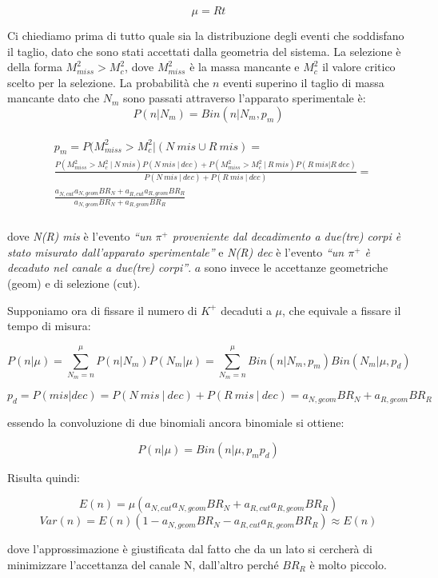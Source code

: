\documentclass[8pt]{extarticle}
\begin{document}
$$
\mu = Rt
$$

Ci chiediamo prima di tutto quale sia la distribuzione degli eventi che soddisfano il taglio, dato che sono stati accettati dalla geometria del sistema. La selezione è della forma $M^2_{miss} > M^2_c$, dove $M^2_{miss}$ è la massa mancante e $M^2_c$ il valore critico scelto per la selezione. La probabilità che $n$ eventi superino il taglio di massa mancante dato che $N_m$ sono passati attraverso l'apparato sperimentale è:
$$
P(n | N_m) = Bin(n | N_m, p_m)
$$

\begin{align*}
\begin{split}
& p_m = P(M^2_{miss} > M^2_c | (N\ mis \cup R\ mis) = \\
& \frac{P(M^2_{miss} > M^2_c\ |\ N\ mis)P(N\ mis\ |\ dec) + P(M^2_{miss} > M^2_c\ |\ R\ mis)P(R\ mis | R\ dec)}{P(N\ mis\ |\ dec) + P(R\ mis\ |\ dec)} = \\
& \frac{a_{N, cut}a_{N, geom}BR_N + a_{R, cut}a_{R, geom}BR_R}{a_{N, geom}BR_N + a_{R, geom}BR_R} \\
\end{split}
\end{align*}

\justify

dove \textit{N(R) mis} è l'evento \textit{``un $\pi^+$ proveniente dal decadimento a due(tre) corpi è stato misurato dall'apparato sperimentale''} e \textit{N(R) dec} è l'evento \textit{``un $\pi^+$ è decaduto nel canale a due(tre) corpi''}. $a$ sono invece le accettanze geometriche (geom) e di selezione (cut).

Supponiamo ora di fissare il numero di $K^+$ decaduti a $\mu$, che equivale a fissare il tempo di misura:

$$
P(n | \mu) = \sum_{N_m = n}^{\mu} P(n | N_m)P(N_m | \mu) = \sum_{N_m = n}^{\mu} Bin(n | N_m, p_m) Bin(N_m | \mu, p_d)
$$

$$
p_d = P(mis | dec) = P(N\ mis\ |\ dec) + P(R\ mis\ |\ dec) = a_{N,geom}BR_N + a_{R, geom}BR_R
$$

essendo la convoluzione di due binomiali ancora binomiale si ottiene: 

$$
P(n | \mu) = Bin(n | \mu, p_m p_d)
$$

Risulta quindi:

$$
E(n) = \mu (a_{N,cut}a_{N,geom}BR_N + a_{R,cut}a_{R,geom}BR_R)
$$
$$
Var(n) = E(n)(1 - a_{N,geom}BR_N - a_{R,cut}a_{R,geom}BR_R) \approx E(n)
$$

dove l'approssimazione è giustificata dal fatto che da un lato si cercherà di minimizzare l'accettanza del canale N, dall'altro perché $BR_R$ è molto piccolo.
\end{document}
